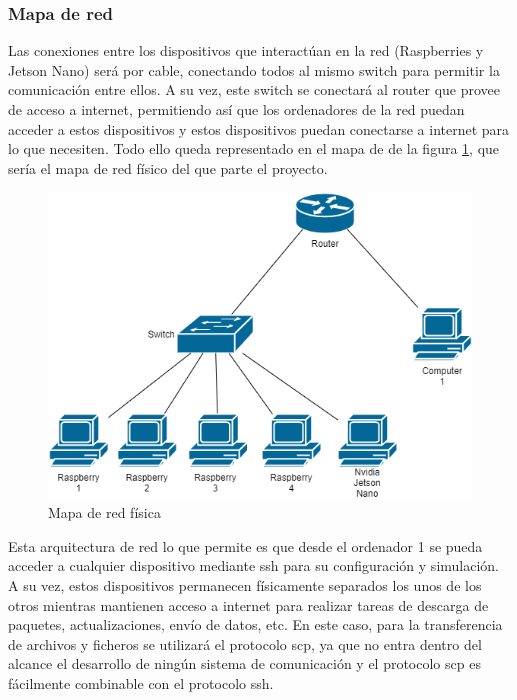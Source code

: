\subsubsection{Mapa de red}
Las conexiones entre los dispositivos que interactúan en la red (Raspberries y Jetson Nano) será por cable, conectando todos al mismo switch para permitir la comunicación entre ellos. A su vez, este switch se conectará al router que provee de acceso a internet, permitiendo así que los ordenadores de la red puedan acceder a estos dispositivos y estos dispositivos puedan conectarse a internet para lo que necesiten. Todo ello queda representado en el mapa de de la figura \ref{fig:MapaRed}, que sería el mapa de red físico del que parte el proyecto.
\begin{figure}[H]
    \centering
    \includegraphics[width=\textwidth]{Figuras/Network_map.png}    
    \caption{Mapa de red física} 
    \label{fig:MapaRed}
\end{figure}

Esta arquitectura de red lo que permite es que desde el ordenador 1 se pueda acceder a cualquier dispositivo mediante ssh para su configuración y simulación. A su vez, estos dispositivos permanecen físicamente separados los unos de los otros mientras mantienen acceso a internet para realizar tareas de descarga de paquetes, actualizaciones, envío de datos, etc. En este caso, para la transferencia de archivos y ficheros se utilizará el protocolo scp, ya que no entra dentro del alcance el desarrollo de ningún sistema de comunicación y el protocolo scp es fácilmente combinable con el protocolo ssh.

\pagebreak

